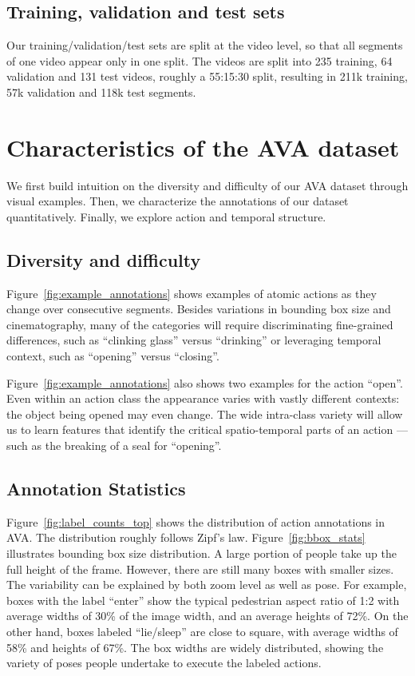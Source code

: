 \documentclass[10pt,twocolumn,letterpaper]{article}
\begin{document}
\subsection{Training, validation and test sets}

Our training/validation/test sets are split at the video level, so that all segments of one video appear only in one split. The \numMovies{} videos are split into 235 training, 64 validation and 131 test videos, roughly a 55:15:30 split, resulting in 211k training, 57k validation and 118k test segments. 
\section{Characteristics of the AVA dataset}
\label{sec:stats}

We first build intuition on the diversity and difficulty of our AVA dataset through visual examples. Then, we characterize the annotations of our dataset quantitatively. Finally, we explore action and temporal structure.

\subsection{Diversity and difficulty}

Figure~\ref{fig:example_annotations} shows examples of atomic actions as they change over consecutive segments. Besides variations in bounding box size and cinematography, many of the categories will require discriminating fine-grained differences, such as ``clinking glass'' versus ``drinking'' or leveraging temporal context, such as ``opening'' versus ``closing''. 

Figure~\ref{fig:example_annotations} also shows two examples for the action ``open''. Even within an action class the appearance varies with vastly different contexts: the object being opened may even change.  The wide intra-class variety will allow us to learn features that identify the critical spatio-temporal parts of an action --- such as the breaking of a seal for ``opening''.

\subsection{Annotation Statistics}

Figure~\ref{fig:label_counts_top} shows the distribution of action annotations in AVA. The distribution roughly follows Zipf's law. Figure~\ref{fig:bbox_stats} illustrates bounding box size distribution. A large portion of people take up the full height of the frame. However, there are still many boxes with smaller sizes. The variability can be explained by both zoom level as well as pose. For example, boxes with the label ``enter'' show the typical pedestrian aspect ratio of 1:2 with average widths of 30\% of the image width, and an average heights of 72\%. On the other hand, boxes labeled ``lie/sleep'' are close to square, with average widths of 58\% and heights of 67\%. The box widths are widely distributed, showing the variety of poses people undertake to execute the labeled actions. 
\end{document}
